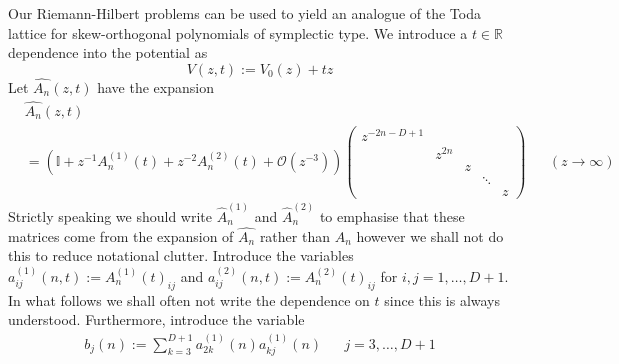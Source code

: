 \documentclass[12pt]{article}
\theoremstyle{definition}
\begin{document}
Our Riemann-Hilbert problems can be used to yield an analogue of the Toda lattice for skew-orthogonal polynomials of symplectic type.  We introduce a $t \in \mathbb{R}$ dependence into the potential as
\begin{equation}\label{deformation}
 V(z,t) := V_0(z) + tz
\end{equation}
Let $\widehat{A_{n}}(z,t)$ have the expansion
\begin{align*}
&\widehat{A_{n}}(z,t) \\
&= \left( \mathbb{I}+ z^{-1} A_{n}^{(1)}(t) + z^{-2} A_{n}^{(2)}(t) + \mathcal{O}(z^{-3}) \right) \left(\begin{matrix}
z^{-2n-D+1} \\
& z^{2n} \\
& & z \\
& & & \ddots  \\
& & & & z
\end{matrix} \right) & & (z \to \infty)
\end{align*}
Strictly speaking we should write $\widehat{A}_n^{(1)}$ and $\widehat{A}_n^{(2)}$ to emphasise that these matrices come from the expansion of $\widehat{A_n}$ rather than $A_n$ however we shall not do this to reduce notational clutter. Introduce the variables $a_{ij}^{(1)}(n,t) := A_{n}^{(1)}(t)_{ij}$ and $a_{ij}^{(2)}(n,t) := A_{n}^{(2)}(t)_{ij}$ for $i,j=1, \dots, D+1$.  In what follows we shall often not write the dependence on $t$ since this is always understood. Furthermore, introduce the variable
\begin{align}\label{defb}
b_j(n) := \sum_{k=3}^{D+1} a_{2k}^{(1)}(n) a_{kj}^{(1)}(n) & & j=3, \dots, D+1 
\end{align}
\end{document}
